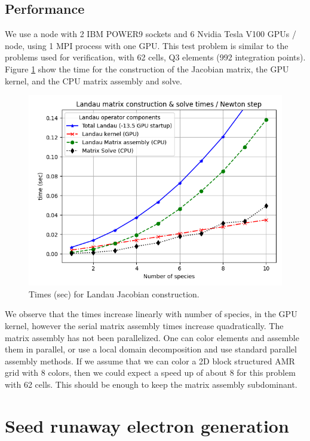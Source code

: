 \documentclass[12pt]{siamart}
\begin{document}
\subsection{Performance}
We use a node with 2 IBM POWER9 sockets and 6 Nvidia Tesla V100 GPUs / node, using 1 MPI process with one GPU.
This test problem is similar to the problems used for verification, with 62 cells, Q3 elements (992 integration points).
Figure \ref{fig:perf} show the time for the construction of the Jacobian matrix, the GPU kernel, and the CPU matrix assembly and solve.
\begin{figure}[htbp]
\begin{center}
\includegraphics[width=.6\linewidth]{./PPT/landau_time_species.png}
\caption{Times (sec) for Landau Jacobian construction.}
\label{fig:perf}
\end{center}
\end{figure}
We observe that the times increase linearly with number of species, in the GPU kernel, however the serial matrix assembly times increase quadratically.
The matrix assembly has not been parallelized.
One can color elements and assemble them in parallel, or use a local domain decomposition and use standard parallel assembly methods.
If we assume that we can color a 2D block structured AMR grid with 8 colors, then we could expect a speed up of about 8 for this problem with 62 cells.
This should be enough to keep the matrix assembly subdominant.

\section{Seed runaway electron generation}
\end{document}
